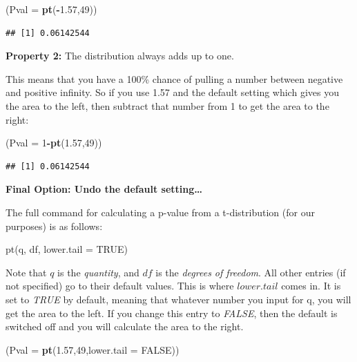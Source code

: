 \documentclass[
]{book}
\newenvironment{Shaded}{\begin{snugshade}}{\end{snugshade}}
\newcommand{\AttributeTok}[1]{\textcolor[rgb]{0.13,0.29,0.53}{#1}}
\newcommand{\ConstantTok}[1]{\textcolor[rgb]{0.56,0.35,0.01}{#1}}
\newcommand{\DecValTok}[1]{\textcolor[rgb]{0.00,0.00,0.81}{#1}}
\newcommand{\FloatTok}[1]{\textcolor[rgb]{0.00,0.00,0.81}{#1}}
\newcommand{\FunctionTok}[1]{\textcolor[rgb]{0.13,0.29,0.53}{\textbf{#1}}}
\newcommand{\NormalTok}[1]{#1}
\newcommand{\SpecialCharTok}[1]{\textcolor[rgb]{0.81,0.36,0.00}{\textbf{#1}}}
\begin{document}
\begin{Shaded}
\begin{Highlighting}[]
\NormalTok{(}\AttributeTok{Pval =} \FunctionTok{pt}\NormalTok{(}\SpecialCharTok{{-}}\FloatTok{1.57}\NormalTok{,}\DecValTok{49}\NormalTok{))}
\end{Highlighting}
\end{Shaded}

\begin{verbatim}
## [1] 0.06142544
\end{verbatim}

\textbf{Property 2:} The distribution always adds up to one.

This means that you have a 100\% chance of pulling a number between negative and positive infinity. So if you use 1.57 and the default setting which gives you the area to the left, then subtract that number from 1 to get the area to the right:

\begin{Shaded}
\begin{Highlighting}[]
\NormalTok{(}\AttributeTok{Pval =} \DecValTok{1}\SpecialCharTok{{-}}\FunctionTok{pt}\NormalTok{(}\FloatTok{1.57}\NormalTok{,}\DecValTok{49}\NormalTok{))}
\end{Highlighting}
\end{Shaded}

\begin{verbatim}
## [1] 0.06142544
\end{verbatim}

\textbf{Final Option: Undo the default setting\ldots{}}

The full command for calculating a p-value from a t-distribution (for our purposes) is as follows:

pt(q, df, lower.tail = TRUE)

Note that \(q\) is the \emph{quantity}, and \(df\) is the \emph{degrees of freedom}. All other entries (if not specified) go to their default values. This is where \(lower.tail\) comes in. It is set to \emph{TRUE} by default, meaning that whatever number you input for q, you will get the area to the left. If you change this entry to \emph{FALSE}, then the default is switched off and you will calculate the area to the right.

\begin{Shaded}
\begin{Highlighting}[]
\NormalTok{(}\AttributeTok{Pval =} \FunctionTok{pt}\NormalTok{(}\FloatTok{1.57}\NormalTok{,}\DecValTok{49}\NormalTok{,}\AttributeTok{lower.tail =} \ConstantTok{FALSE}\NormalTok{))}
\end{Highlighting}
\end{Shaded}
\end{document}
